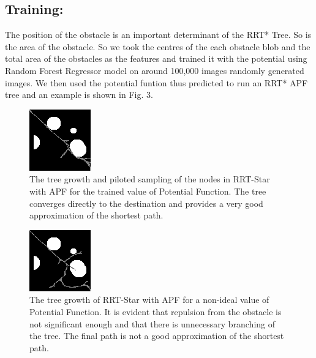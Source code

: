 \documentclass[runningheads]{llncs}
\begin{document}
\subsection{Training:}
The position of the obstacle is an important determinant of the RRT* Tree. So is the area of the obstacle. So we took the centres of the each obstacle blob and the total area of the obstacles as the features and trained it with the potential using Random Forest Regressor model on around 100,000 images randomly generated images. We then used the potential funtion thus predicted to run an RRT* APF tree and an example is shown in Fig. 3.
\vspace{10mm}
\begin{figure}
\begin{center}
\includegraphics[scale=1.5]{img_bam.png}
    \caption{ The tree growth and piloted sampling of the nodes in RRT-Star with APF for the trained value of Potential Function. The tree converges directly to the destination and provides a very good approximation of the shortest path.} \label{fig1}
\end{center}
\end{figure}
\begin{figure}
\begin{center}
\includegraphics[scale=1.5]{tree.png}
    \caption{ The tree growth of RRT-Star with APF for a non-ideal value of Potential Function. It is evident that repulsion from the obstacle is not significant enough and that there is unnecessary branching of the tree. The final path is not a good approximation of the shortest path.} \label{fig1}
\end{center}
\end{figure}
\end{document}
